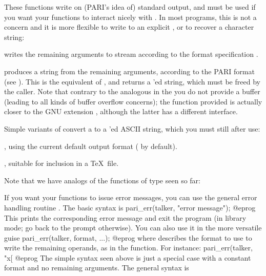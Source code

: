 These functions write on (PARI's idea of) standard output, and must be used
if you want your functions to interact nicely with . In most
programs, this is not a concern and it is more flexible to write to an
explicit , or to recover a character string:

 writes the
remaining arguments to stream  according to the format
specification .

 produces a string from the
remaining arguments, according to the PARI format  (see ).
This is the  equivalent of , and returns a
'ed string, which must be freed by the caller. Note that contrary
to the analogous  in the  you do not provide a buffer
(leading to all kinds of buffer overflow concerns); the function provided is
actually closer to the GNU extension , although the latter has
a different interface.

Simple variants of  convert a  to a
'ed ASCII string, which you must still  after use:

, using the current default output format
( by default).

, suitable for inclusion in a \TeX\ file.


Note that we have  analogs of the functions of  type
seen so far:





\noindent
If you want your functions to issue error messages, you can use the general
error handling routine . The basic syntax is
%
\bprog
  pari_err(talker, "error message");
@eprog\noindent
This prints the corresponding error message and exit the program (in
library mode; go back to the  prompt otherwise).\label{se:err} You can
also use it in the more versatile guise
\bprog
  pari_err(talker, format, ...);
@eprog\noindent
where  describes the format to use to write the remaining
operands, as in the  function. For instance:
\bprog
  pari_err(talker, "x[%
@eprog\noindent
The simple syntax seen above is
just a special case with a constant format and no remaining arguments.
The general syntax is

